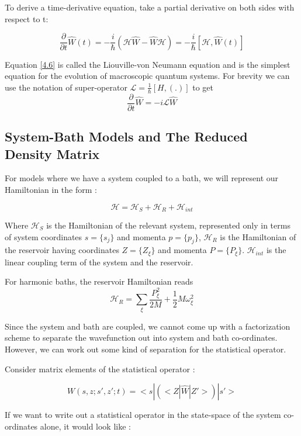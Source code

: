 To derive a time-derivative equation, take a partial derivative on both sides with respect to t:

\begin{equation} \label{4.6}
    \frac{\partial}{\partial t} \hat{W}(t) = -\frac{i}{\hbar}(\mathcal{H} \hat{W} - \hat{W} \mathcal{H}) = -\frac{i}{\hbar}[\mathcal{H}, \hat{W}(t)]
\end{equation}

Equation \ref{4.6} is called the Liouville-von Neumann equation and is the simplest equation for the evolution of macroscopic quantum systems. For brevity we can use the notation of super-operator $\mathcal{L} = \frac{1}{\hbar}[H, (.)]$ to get $$\frac{\partial}{\partial t} \hat{W} = -i \mathcal{L} \hat{W}$$

\subsection{System-Bath Models and The Reduced Density Matrix}

For models where we have a system coupled to a bath, we will represent our Hamiltonian in the form : 

\begin{equation} \label{4.7}
    \mathcal{H} = \mathcal{H}_S + \mathcal{H}_R + \mathcal{H}_{int}
\end{equation}

Where $\mathcal{H}_S$ is the Hamiltonian of the relevant system, represented only in terms of system coordinates $s = \{s_j\}$ and momenta $p = \{p_j\}$, $\mathcal{H}_R$ is the Hamiltonian of the reservoir having coordinates $Z = \{Z_{\xi}\}$ and momenta $P = \{P_{\xi}\}$. $\mathcal{H}_{int}$ is the linear coupling term of the system and the reservoir. 

For harmonic baths, the reservoir Hamiltonian reads $$\mathcal{H}_{R} = \sum_{\xi} \frac{P_{\xi}^2}{2M} + \frac{1}{2}M \omega_{\xi}^2$$

Since the system and bath are coupled, we cannot come up with a factorization scheme to separate the wavefunction out into system and bath co-ordinates. However, we can work out some kind of separation for the statistical operator.

Consider matrix elements of the statistical operator :

$$W(s, z ; s', z' ; t) = <s|(<Z|\hat{W}|Z'>)|s'>$$

If we want to write out a statistical operator in the state-space of the system co-ordinates alone, it would look like :

